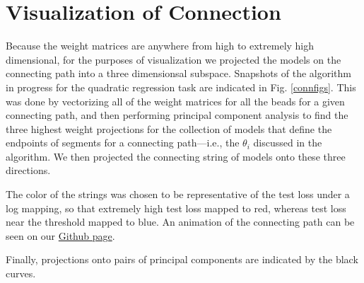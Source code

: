 \section{Visualization of Connection}
\label{visualization}

 Because the weight matrices are anywhere from high to extremely high dimensional, for the purposes of visualization we projected the models on the connecting path into a three dimensionsal subspace.  Snapshots of the algorithm in progress for the quadratic regression task are indicated in Fig. \ref{connfigs}.  This was done by vectorizing all of the weight matrices for all the beads for a given connecting path, and then performing principal component analysis to find the three highest weight projections for the collection of models that define the endpoints of segments for a connecting path---i.e., the $\theta_i$ discussed in the algorithm.  We then projected the connecting string of models onto these three directions.  
 
 The color of the strings was chosen to be representative of the test loss under a log mapping, so that extremely high test loss mapped to red, whereas test loss near the threshold mapped to blue.  An animation of the connecting path can be seen on our \href{github.com/danielfreeman11/convex-nets/blob/master/Writeup/Plots/quadratic.pathinterp.errorvis.gif}{Github page}.
 
 Finally, projections onto pairs of principal components are indicated by the black curves.
 
